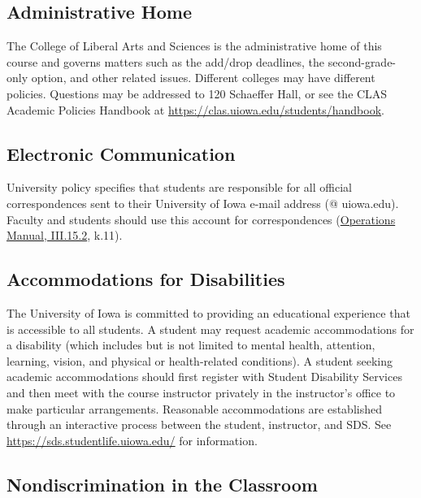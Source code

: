 \documentclass[11pt,]{article}
\theoremstyle{definition}
\theoremstyle{definition}
\theoremstyle{definition}
\theoremstyle{remark}
\begin{document}
\subsection{Administrative Home}\label{administrative-home}

The College of Liberal Arts and Sciences is the administrative home of
this course and governs matters such as the add/drop deadlines, the
second-grade-only option, and other related issues. Different colleges
may have different policies. Questions may be addressed to 120 Schaeffer
Hall, or see the CLAS Academic Policies Handbook at
\url{https://clas.uiowa.edu/students/handbook}.

\subsection{Electronic Communication}\label{electronic-communication}

University policy specifies that students are responsible for all
official correspondences sent to their University of Iowa e-mail address
(@ uiowa.edu). Faculty and students should use this account for
correspondences
(\href{https://opsmanual.uiowa.edu/human-resources/professional-ethics-and-academic-responsibility\#15.2}{Operations
Manual, III.15.2}, k.11).

\subsection{Accommodations for
Disabilities}\label{accommodations-for-disabilities}

The University of Iowa is committed to providing an educational
experience that is accessible to all students. A student may request
academic accommodations for a disability (which includes but is not
limited to mental health, attention, learning, vision, and physical or
health-related conditions). A student seeking academic accommodations
should first register with Student Disability Services and then meet
with the course instructor privately in the instructor's office to make
particular arrangements. Reasonable accommodations are established
through an interactive process between the student, instructor, and SDS.
See \url{https://sds.studentlife.uiowa.edu/} for information.

\subsection{Nondiscrimination in the
Classroom}\label{nondiscrimination-in-the-classroom}
\end{document}
